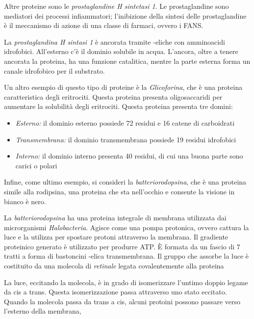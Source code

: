 Altre proteine sono le \emph{prostaglandine H sintetasi 1}. Le prostaglandine sono mediatori dei processi infiammatori; l'inibizione della sintesi delle prostaglandine è il meccanismo di azione di una classe di farmaci, ovvero i FANS.

La \emph{prostaglandina H sintasi 1} è ancorata tramite \alpha-eliche con amminoacidi idrofobici. All'esterno c'è il dominio solubile in acqua. L'ancora, oltre a tenere ancorata la proteina, ha una funzione catalitica, mentre la parte esterna forma un canale idrofobico per il substrato.

Un altro esempio di questo tipo di proteine è la \emph{Glicoforina}, che è una proteina caratteristica degli eritrociti. Questa proteina presenta oligosaccaridi per aumentare la solubilità degli eritrociti. Questa proteina presenta tre domini:
\begin{itemize}
\item \emph{Esterno:} il dominio esterno possiede 72 residui e 16 catene di carboidrati
\item \emph{Transmembrana:} il dominio transmembrana possiede 19 residui idrofobici
\item \emph{Interno:} il dominio interno presenta 40 residui, di cui una buona parte sono carici o polari
\end{itemize}


Infine, come ultimo esempio, si consideri la \emph{batteriorodopsina}, che è una proteina simile alla rodipsina, una proteina che sta nell'occhio e consente la visione in bianco è nero.

La \emph{batteriorodopsina} ha una proteina integrale di membrana utilizzata dai microrganismi \emph{Halobacteria}. Agisce come una pompa protonica, ovvero cattura la luce e la utilizza per spostare protoni attraverso la membrana. Il gradiente proteinico generato è utilizzato per produrre ATP.{}
È formata da un fascio di 7 tratti a forma di bastoncini \alpha-elica transmembrana. Il gruppo che assorbe la luce è costituito da una molecola di \emph{retinale} legata covalentemente alla proteina

La luce, eccitando la molecola, è in grado di isomerizzare l'untimo doppio legame da cis a trans. Questa isomerizzazione passa attraverso uno stato eccitato. Quando la molecola passa da trans a cis, alcuni protoini possono passare verso l'esterno della membrana,
